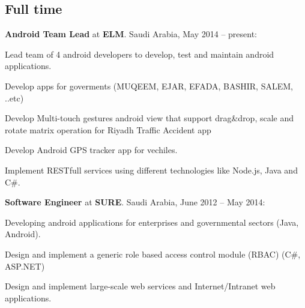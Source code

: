 \documentclass[letterpaper]{article}
\renewenvironment{itemize}{
  \begin{list}{}{
    \setlength{\leftmargin}{1.5em}
  }
}{
  \end{list}
}
\begin{document}
\subsection*{Full time}
\begin{itemize}

\item \textbf{Android Team Lead} at \textbf{ELM}.  Saudi Arabia, May 2014 -- present:
\begin{itemize}
\item Lead team of 4 android developers to develop, test and maintain android applications.
\item Develop apps for goverments (MUQEEM, EJAR, EFADA, BASHIR, SALEM, ..etc)
\item Develop Multi-touch gestures android view that support drag\&drop, scale and rotate matrix operation for Riyadh Traffic Accident app
\item Develop Android GPS tracker app for vechiles.
\item Implement RESTfull services using different technologies like Node.js, Java and C\#.
\end{itemize}

\item \textbf{Software Engineer} at \textbf{SURE}.  Saudi Arabia, June 2012 -- May 2014:
\begin{itemize}
\item Developing android applications for enterprises and governmental sectors (Java, Android).
\item Design and implement a generic role based access control module (RBAC) (C\#, ASP.NET)
\item Design and implement large-scale web services and Internet/Intranet web applications.
\end{itemize}


\end{itemize}
\end{document}
